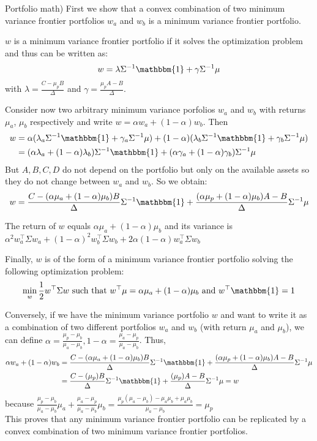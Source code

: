 \documentclass[10pt]{article}
\newenvironment{exercise}[2][Exercise]{\begin{trivlist}
  \item[\hskip \labelsep {\bfseries #1}\hskip \labelsep {\bfseries #2.}]}{\end{trivlist}}
\begin{document}
\begin{exercise}{2}(Portfolio math)
   First we show that a convex combination of two minimum variance frontier portfolios $w_a$ and $w_b$ is a minimum variance frontier portfolio.

   $w$ is a minimum variance frontier portfolio if it solves the optimization problem and thus can be written as: 
   $$ w = \lambda\Sigma^{-1}\mathbbm{1}+ \gamma\Sigma^{-1}\mu$$ with $\lambda = \frac{C- \mu_pB}{\Delta}$ and $\gamma = \frac{\mu_pA-B}{\Delta}$. 

   Consider now two arbitrary minimum variance porfolios $w_a$ and $w_b$ with returns $\mu_a$, $\mu_b$ respectively and write $w = \alpha w_a + (1-\alpha)w_b$. 
   Then \begin{align*}
    w &= \alpha (\lambda_a\Sigma^{-1}\mathbbm{1} + \gamma_a\Sigma^{-1}\mu) + (1-\alpha)(\lambda_b\Sigma^{-1}\mathbbm{1} + \gamma_b\Sigma^{-1}\mu) \\
    &= (\alpha \lambda_a + (1-\alpha) \lambda_b)\Sigma^{-1}\mathbbm{1} + (\alpha \gamma_a + (1-\alpha) \gamma_b)\Sigma^{-1}\mu
   \end{align*} 
   But $A,B,C,D$ do not depend on the portfolio but only on the available assets so they do not change between $w_a$ and $w_b$. So we obtain:
   $$ w = \frac{C- (\alpha\mu_a+(1-\alpha)\mu_b)B}{\Delta}\Sigma^{-1}\mathbbm{1} + \frac{(\alpha\mu_p + (1-\alpha)\mu_b)A-B}{\Delta}\Sigma^{-1}\mu$$

  The return of $w$ equals $\alpha\mu_a+(1-\alpha)\mu_b$ and its variance is $\alpha^2 w_a^\top\Sigma w_a + (1-\alpha)^2 w_b^\top\Sigma w_b + 2\alpha(1-\alpha)w_a^\top\Sigma w_b$

  Finally, $w$ is of the form of a minimum variance frontier portfolio solving the following optimization problem: 
  $$ \min_{w} \frac{1}{2} w^\top\Sigma w \text{ such that } w^\top\mu = \alpha\mu_a+(1-\alpha)\mu_b \text{ and } w^\top\mathbbm{1} = 1$$
  
  Conversely, if we have the minimum variance portfolio $w$ and want to write it as a combination of two different portfolios $w_a$ and $w_b$ (with return $\mu_a$ and $\mu_b$), we can define $\alpha = \frac{\mu_p-\mu_b}{\mu_a-\mu_b}, 1- \alpha = \frac{\mu_a - \mu_p}{\mu_a - \mu_b}$. 
  Thus, \begin{align*}
    \alpha w_a + (1-\alpha)w_b &= \frac{C- (\alpha\mu_a+(1-\alpha)\mu_b)B}{\Delta}\Sigma^{-1}\mathbbm{1} + \frac{(\alpha\mu_p + (1-\alpha)\mu_b)A-B}{\Delta}\Sigma^{-1}\mu \\
    &= \frac{C- (\mu_p)B}{\Delta}\Sigma^{-1}\mathbbm{1} + \frac{(\mu_p)A-B}{\Delta}\Sigma^{-1}\mu = w
  \end{align*} because $ \frac{\mu_p-\mu_b}{\mu_a-\mu_b}\mu_a + \frac{\mu_a - \mu_p}{\mu_a - \mu_b}\mu_b = \frac{\mu_p(\mu_a-\mu_b)-\mu_a\mu_b + \mu_a\mu_b}{\mu_a-\mu_b} = \mu_p$
\\
  This proves that any minimum variance frontier portfolio can be replicated by a convex combination of two minimum variance frontier portfolios. 


\end{exercise}
\end{document}
